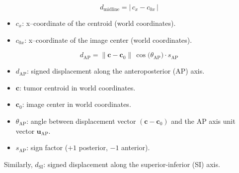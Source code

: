 \documentclass[fleqn]{article} %
\begin{document}
\begin{equation*}
d_{\text{midline}} = \bigl|\, c_x - c_{0x} \,\bigr|
\end{equation*}


\begin{itemize}
  \item $c_x$: x–coordinate of the centroid (world coordinates).
  \item $c_{0x}$: x–coordinate of the image center (world coordinates).
\end{itemize}

\begin{equation*}
d_{\text{AP}} = \|\mathbf{c} - \mathbf{c}_0\| \, \cos\!\bigl(\theta_{\text{AP}}\bigr) \cdot s_{\text{AP}}
\end{equation*}


\begin{itemize}
  \item $d_{\text{AP}}$: signed displacement along the anteroposterior (AP) axis.
  \item $\mathbf{c}$: tumor centroid in world coordinates.
  \item $\mathbf{c}_0$: image center in world coordinates.
  \item $\theta_{\text{AP}}$: angle between displacement vector $(\mathbf{c} - \mathbf{c}_0)$ and the AP axis unit vector $\mathbf{u}_{\text{AP}}$.
  \item $s_{\text{AP}}$: sign factor ($+1$ posterior, $-1$ anterior).
\end{itemize}

Similarly, $d_{\text{SI}}$: signed displacement along the superior-inferior (SI) axis.
\end{document}
